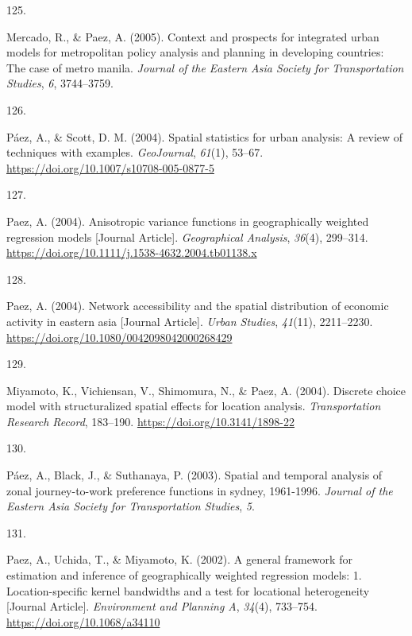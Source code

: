 \documentclass[10pt,a4paper,]{twentysecondcv}
\newlength{\csllabelwidth}
\newcommand{\CSLLeftMargin}[1]{\parbox[t]{\csllabelwidth}{#1}}
\newcommand{\CSLRightInline}[1]{\parbox[t]{\linewidth - \csllabelwidth}{#1}}
\begin{document}
\leavevmode{}%
\CSLLeftMargin{125. }%
\CSLRightInline{Mercado, R., \& Paez, A. (2005). Context and prospects
for integrated urban models for metropolitan policy analysis and
planning in developing countries: The case of metro manila.
\emph{Journal of the Eastern Asia Society for Transportation Studies},
\emph{6}, 3744--3759.}

\leavevmode{}%
\CSLLeftMargin{126. }%
\CSLRightInline{Páez, A., \& Scott, D. M. (2004). Spatial statistics for
urban analysis: A review of techniques with examples. \emph{GeoJournal},
\emph{61}(1), 53--67. \url{https://doi.org/10.1007/s10708-005-0877-5}}

\leavevmode{}%
\CSLLeftMargin{127. }%
\CSLRightInline{Paez, A. (2004). Anisotropic variance functions in
geographically weighted regression models {[}Journal Article{]}.
\emph{Geographical Analysis}, \emph{36}(4), 299--314.
\url{https://doi.org/10.1111/j.1538-4632.2004.tb01138.x}}

\leavevmode{}%
\CSLLeftMargin{128. }%
\CSLRightInline{Paez, A. (2004). Network accessibility and the spatial
distribution of economic activity in eastern asia {[}Journal Article{]}.
\emph{Urban Studies}, \emph{41}(11), 2211--2230.
\url{https://doi.org/10.1080/0042098042000268429}}

\leavevmode{}%
\CSLLeftMargin{129. }%
\CSLRightInline{Miyamoto, K., Vichiensan, V., Shimomura, N., \& Paez, A.
(2004). Discrete choice model with structuralized spatial effects for
location analysis. \emph{Transportation Research Record}, 183--190.
\url{https://doi.org/10.3141/1898-22}}

\leavevmode{}%
\CSLLeftMargin{130. }%
\CSLRightInline{Páez, A., Black, J., \& Suthanaya, P. (2003). Spatial
and temporal analysis of zonal journey-to-work preference functions in
sydney, 1961-1996. \emph{Journal of the Eastern Asia Society for
Transportation Studies}, \emph{5}.}

\leavevmode{}%
\CSLLeftMargin{131. }%
\CSLRightInline{Paez, A., Uchida, T., \& Miyamoto, K. (2002). A general
framework for estimation and inference of geographically weighted
regression models: 1. Location-specific kernel bandwidths and a test for
locational heterogeneity {[}Journal Article{]}. \emph{Environment and
Planning A}, \emph{34}(4), 733--754.
\url{https://doi.org/10.1068/a34110}}
\end{document}
